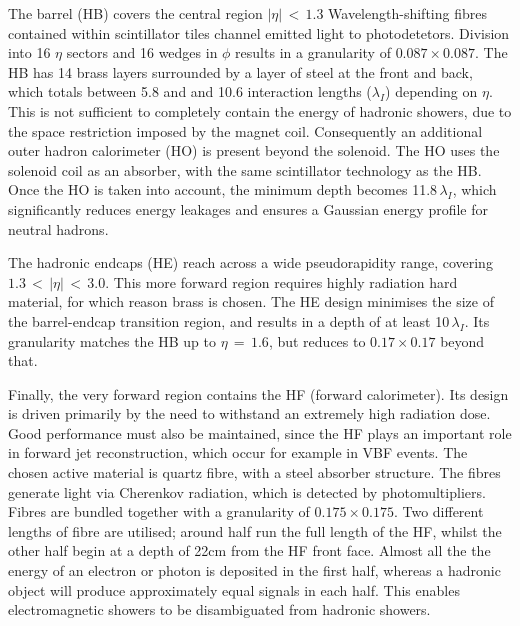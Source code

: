 The barrel (HB) covers the central region $|\eta|\,<\,1.3$
Wavelength-shifting fibres contained within scintillator tiles channel emitted light to photodetetors.
Division into 16 $\eta$ sectors and 16 wedges in $\phi$ results in a granularity of $0.087\times0.087$.
The HB has 14 brass layers surrounded by a layer of steel at the front and back, 
which totals between 5.8 and and 10.6 interaction lengths ($\lambda_I$) depending on $\eta$. %
This is not sufficient to completely contain the energy of hadronic showers, due to the space restriction imposed by the magnet coil.
Consequently an additional outer hadron calorimeter (HO) is present beyond the solenoid.
The HO uses the solenoid coil as an absorber, with the same scintillator technology as the HB.
Once the HO is taken into account, the minimum depth becomes 11.8\,$\lambda_I$, 
which significantly reduces energy leakages and ensures a Gaussian energy profile for neutral hadrons.

The hadronic endcaps (HE) reach across a wide pseudorapidity range, covering $1.3\,<\,|\eta|\,<\,3.0$.
This more forward region requires highly radiation hard material, for which reason brass is chosen. %
The HE design minimises the size of the barrel-endcap transition region, and results in a depth of at least 10\,$\lambda_I$.
Its granularity matches the HB up to $\eta\,=\,1.6$, but reduces to $0.17\times0.17$ beyond that.

Finally, the very forward region contains the HF (forward calorimeter).
Its design is driven primarily by the need to withstand an extremely high radiation dose.
Good performance must also be maintained, since the HF plays an important role in forward jet reconstruction, which occur for example in VBF \Hgg events.
The chosen active material is quartz fibre, with a steel absorber structure.
The fibres generate light via Cherenkov radiation, which is detected by photomultipliers.
Fibres are bundled together with a granularity of $0.175\times0.175$.
Two different lengths of fibre are utilised; 
around half run the full length of the HF, whilst the other half begin at a depth of 22cm from the HF front face.
Almost all the the energy of an electron or photon is deposited in the first half, 
whereas a hadronic object will produce approximately equal signals in each half.
This enables electromagnetic showers to be disambiguated from hadronic showers.

